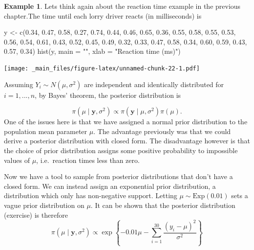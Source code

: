 \documentclass[
]{book}
\newenvironment{Shaded}{\begin{snugshade}}{\end{snugshade}}
\newcommand{\AttributeTok}[1]{\textcolor[rgb]{0.77,0.63,0.00}{#1}}
\newcommand{\FloatTok}[1]{\textcolor[rgb]{0.00,0.00,0.81}{#1}}
\newcommand{\FunctionTok}[1]{\textcolor[rgb]{0.00,0.00,0.00}{#1}}
\newcommand{\NormalTok}[1]{#1}
\newcommand{\OtherTok}[1]{\textcolor[rgb]{0.56,0.35,0.01}{#1}}
\newcommand{\StringTok}[1]{\textcolor[rgb]{0.31,0.60,0.02}{#1}}
\theoremstyle{definition}
\theoremstyle{definition}
\newtheorem{example}{Example}[chapter]
\theoremstyle{definition}
\theoremstyle{definition}
\theoremstyle{remark}
\begin{document}
\begin{example}
\protect\hypertarget{exm:norm}{}\label{exm:norm}Lets think again about the reaction time example in the previous chapter.The time until each lorry driver reacts (in milliseconds) is

\begin{Shaded}
\begin{Highlighting}[]
\NormalTok{y }\OtherTok{\textless{}{-}} \FunctionTok{c}\NormalTok{(}\FloatTok{0.34}\NormalTok{, }\FloatTok{0.47}\NormalTok{, }\FloatTok{0.58}\NormalTok{, }\FloatTok{0.27}\NormalTok{, }\FloatTok{0.74}\NormalTok{, }\FloatTok{0.44}\NormalTok{, }\FloatTok{0.46}\NormalTok{, }\FloatTok{0.65}\NormalTok{, }\FloatTok{0.36}\NormalTok{, }\FloatTok{0.55}\NormalTok{, }\FloatTok{0.58}\NormalTok{, }\FloatTok{0.55}\NormalTok{, }\FloatTok{0.53}\NormalTok{, }\FloatTok{0.56}\NormalTok{, }\FloatTok{0.54}\NormalTok{, }\FloatTok{0.61}\NormalTok{, }\FloatTok{0.43}\NormalTok{, }\FloatTok{0.52}\NormalTok{, }\FloatTok{0.45}\NormalTok{, }\FloatTok{0.49}\NormalTok{, }\FloatTok{0.32}\NormalTok{, }\FloatTok{0.33}\NormalTok{, }\FloatTok{0.47}\NormalTok{, }\FloatTok{0.58}\NormalTok{, }\FloatTok{0.34}\NormalTok{, }\FloatTok{0.60}\NormalTok{, }\FloatTok{0.59}\NormalTok{, }\FloatTok{0.43}\NormalTok{, }\FloatTok{0.57}\NormalTok{, }\FloatTok{0.34}\NormalTok{)}
\FunctionTok{hist}\NormalTok{(y, }\AttributeTok{main =} \StringTok{""}\NormalTok{, }\AttributeTok{xlab =} \StringTok{"Reaction time (ms)"}\NormalTok{)}
\end{Highlighting}
\end{Shaded}

\texttt{[image: \_main\_files/figure-latex/unnamed-chunk-22-1.pdf]}

Assuming \(Y_i \sim N(\mu, \sigma^2)\) are independent and identically distributed for \(i=1,...,n\), by Bayes' theorem, the posterior distribution is

\[
\pi(\mu \mid \boldsymbol{y}, \sigma^2) \propto \pi(\boldsymbol{y} \mid \mu, \sigma^2) \pi(\mu).
\]
One of the issues here is that we have assigned a normal prior distribution to the population mean parameter \(\mu\). The advantage previously was that we could derive a posterior distribution with closed form. The disadvantage however is that the choice of prior distribution assigns some positive probability to impossible values of \(\mu\), i.e.~reaction times less than zero.

Now we have a tool to sample from posterior distributions that don't have a closed form. We can instead assign an exponential prior distribution, a distribution which only has non-negative support. Letting \(\mu \sim \textrm{Exp}(0.01)\) sets a vague prior distribution on \(\mu\). It can be shown that the posterior distribution (exercise) is therefore
\[
\pi(\mu \mid \boldsymbol{y}, \sigma^2) \propto \exp\left\{-0.01\mu -\sum_{i=1}^{30}\frac{(y_i - \mu)^2}{\sigma^2}\right\} 
\]


\end{example}
\end{document}
